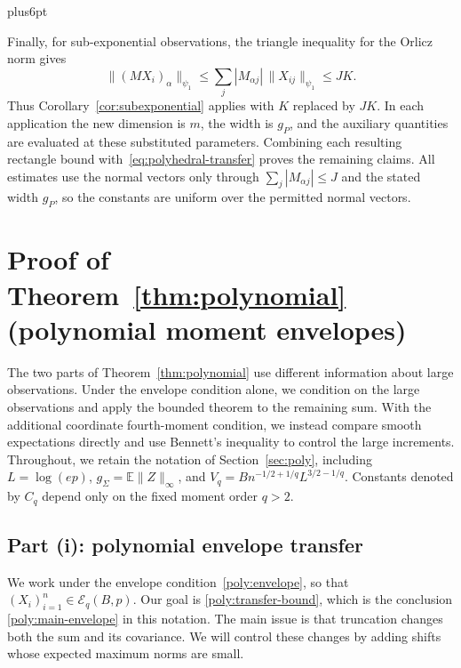\documentclass[11pt,letterpaper,twoside,leqno]{article}
\makeatletter
\theoremstyle{bookplain}
\theoremstyle{bookremark}
\renewenvironment{proof}[1][\proofname]{\par
  \pushQED{\qed}\normalfont\topsep6pt plus6pt\relax
  \trivlist\item[\hskip\labelsep\bfseries #1\@addpunct{.}]\ignorespaces
}{\popQED\endtrivlist\@endpefalse}
\newcommand{\E}{\mathbb E}
\makeatother
\begin{document}
\begin{proof}[Proof of Corollary~\ref{cor:polyhedral-transfer}]
Finally, for sub-exponential observations, the triangle inequality
for the Orlicz norm gives
\[
 \|(MX_i)_\alpha\|_{\psi_1}
 \le\sum_j|M_{\alpha j}|\,\|X_{ij}\|_{\psi_1}\le JK.
\]
Thus Corollary~\ref{cor:subexponential} applies with $K$ replaced
by $JK$. In each application the new dimension is $m$, the width
is $g_P$, and the auxiliary quantities are evaluated at these
substituted parameters. Combining each resulting rectangle bound
with~\eqref{eq:polyhedral-transfer} proves the remaining claims.
All estimates use the normal vectors only through
$\sum_j|M_{\alpha j}|\le J$ and the stated width $g_P$, so the
constants are uniform over the permitted normal vectors.
\end{proof}

\section{\texorpdfstring{{Proof of Theorem~\ref*{thm:polynomial} (polynomial moment envelopes)}}{Proof of Theorem 2 (polynomial moment envelopes)}}\label{app:polynomial-proof}

The two parts of Theorem~\ref{thm:polynomial} use different information
about large observations. Under the envelope condition alone, we
condition on the large observations and apply the bounded theorem
to the remaining sum. With the additional coordinate fourth-moment
condition, we instead compare smooth expectations directly and use
Bennett's inequality to control the large increments. Throughout,
we retain the notation of Section~\ref{sec:poly}, including
$L=\log(ep)$, $g_\Sigma=\E\|Z\|_\infty$, and
$V_q=Bn^{-1/2+1/q}L^{3/2-1/q}$. Constants denoted by $C_q$ depend
only on the fixed moment order $q>2$.

\subsection{\texorpdfstring{{Part (i): polynomial envelope transfer}}{Part (i): polynomial envelope transfer}}\label{app:conditional}

We work under the envelope condition~\eqref{poly:envelope}, so that
$(X_i)_{i=1}^n\in\mathcal E_q(B,p)$. Our goal is
\eqref{poly:transfer-bound}, which is the conclusion
\eqref{poly:main-envelope} in this notation. The main issue is that
truncation changes both the sum and its covariance. We will control
these changes by adding shifts whose expected maximum norms are small.
\end{document}
